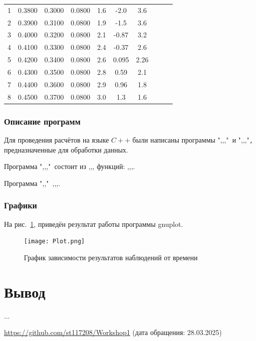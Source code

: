 \begin{center}
\begin{table}[H]
\begin{tabular}{|c|c|c|c|c|c|c|c|c|c|}
\begin{minipage}{20mm}
\end{minipage}\\
\hline
1 & 0.3800 & 0.3000 & 0.0800 & 1.6 & -2.0 & 3.6 & & & \\
2 & 0.3900 & 0.3100 & 0.0800 & 1.9 & -1.5 & 3.6 & & &\\
3 & 0.4000 & 0.3200 & 0.0800 & 2.1 & -0.87 & 3.2 & & &\\
4 & 0.4100 & 0.3300 & 0.0800 & 2.4 & -0.37 & 2.6  & & &\\
5 & 0.4200 & 0.3400 & 0.0800 & 2.6 & 0.095 & 2.26 & & &  \\
6 & 0.4300 & 0.3500 & 0.0800 & 2.8 & 0.59 & 2.1 & & & \\
7 & 0.4400 & 0.3600 & 0.0800 & 2.9 & 0.96 & 1.8 & & &  \\
8 & 0.4500 & 0.3700 & 0.0800 & 3.0 & 1.3 & 1.6 & & &  \\

\hline
\end{tabular}
\end{table}
\end{center}

\subsubsection{Описание программ}
Для проведения расчётов на языке $C++$ были написаны программы ",,,"\verb| |и ",,,"\verb|,| предназначенные для обработки данных.

Программа ",,,"\verb| |состоит из ,,, функций: ,,,.

Программа ",,"\verb| |,,,.


\subsubsection{Графики}

На рис.~\ref{fig:plot}, приведён результат работы программы gnuplot.

\begin{figure}
\centering
\texttt{[image: Plot.png]}
\caption{График зависимости результатов наблюдений от времени}
\label{fig:plot}
\end{figure}

\section{Вывод}
... 

\begin{thebibliography}{9}
\url{https://github.com/st117208/Workshop1}  (дата обращения: 28.03.2025)
\end{thebibliography}